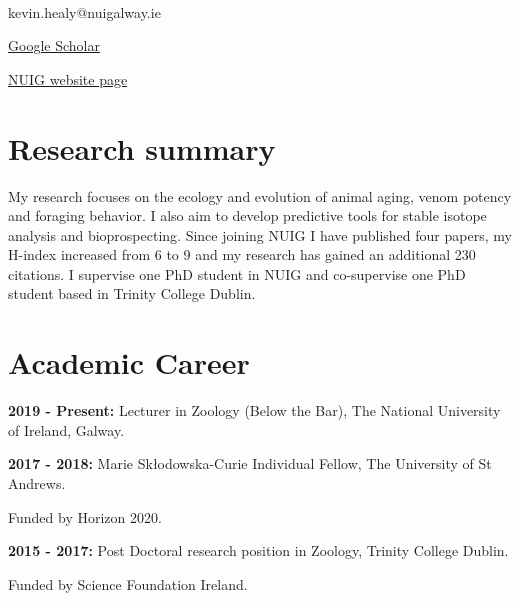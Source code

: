 \documentclass[10pt,a4paper]{article}
\newcommand\textbox[1]{%
  \parbox{.333\textwidth}{#1}%
}
\begin{document}
\par{\smallskip\par}

\large{}\\
\bigskip
\bigskip

\noindent\textbox{kevin.healy@nuigalway.ie}\textbox{\hfil \href{http://scholar.google.com/citations?user=5Kb9u8EAAAAJ}{Google Scholar} \hfil}\textbox{\hfill \href{https://www.nuigalway.ie/zoology/research/macroecology/}{NUIG website page}}


\bigskip


\section{\textbf{Research summary}}
\center

My research focuses on the ecology and evolution of animal aging, venom potency and foraging behavior. I also aim to develop predictive tools for stable isotope analysis and bioprospecting. Since joining NUIG I have published four papers, my H-index increased from 6 to 9 and my research has gained an additional 230 citations. I supervise one PhD student in NUIG and co-supervise one PhD student based in Trinity College Dublin.

\bigskip



\section{\textbf{Academic Career}}

\raggedright	
\textbf{2019 - Present:} Lecturer in Zoology (Below the Bar), The National University of Ireland, Galway.
\bigskip

\raggedright	
\textbf{2017 - 2018:} Marie Sk\l{}odowska-Curie Individual Fellow, The University of St Andrews.
\par{\fontsize{10.5}{10} Funded by Horizon 2020.\bigskip} 

\raggedright	
\textbf{2015 - 2017:} Post Doctoral research position in Zoology, Trinity College Dublin.
 \smallskip
\par{\fontsize{10.5}{10} Funded by Science Foundation Ireland.\bigskip} 
\end{document}
